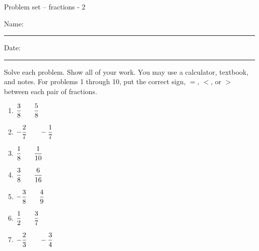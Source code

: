 \documentclass[12pt]{article}
\begin{document}
\pagestyle{empty} %
\begin{center}
          Problem set -- fractions - 2 \\[0.5in]
\end{center}
Name: \rule{4in}{0.005in} Date: \rule{1.5in}{0.005in} 
  \vspace{0.25in}
Solve each problem. Show all of your work. You may use a calculator, textbook, and notes. For problems 1 through 10, put the correct sign, $=$, $<$, or $>$ between each pair of fractions. 

\begin{multicols}{2}
\begin{enumerate}

  \item \hspace{0.25in} $\dfrac{3}{8} \hspace{0.25in} \dfrac{5}{8}$
  \vspace{0.25in}

  \item \hspace{0.25in} $-\dfrac{2}{7} \hspace{0.25in} -\dfrac{1}{7}$
  \vspace{0.25in}

  \item \hspace{0.25in} $\dfrac{1}{8} \hspace{0.25in} \dfrac{1}{10}$
  \vspace{0.25in}

  \item \hspace{0.25in} $\dfrac{3}{8} \hspace{0.25in} \dfrac{6}{16}$
  \vspace{0.25in}

  \item \hspace{0.25in} $-\dfrac{3}{8} \hspace{0.25in} \dfrac{4}{9}$
  \vspace{0.25in}

  \item \hspace{0.25in} $\dfrac{1}{2} \hspace{0.25in} \dfrac{3}{7}$
  \vspace{0.25in}

  \item \hspace{0.25in} $-\dfrac{2}{3} \hspace{0.25in} -\dfrac{3}{4}$
  \vspace{0.25in}


\end{enumerate}
\end{multicols}
\end{document}
